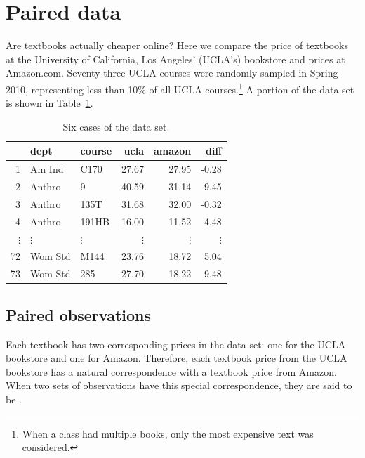 


\textC{\newpage}



\section{Paired data}
\label{pairedData}


Are textbooks actually cheaper online? Here we compare the price of textbooks at the University of California, Los Angeles' (UCLA's) bookstore and prices at Amazon.com. Seventy-three UCLA courses were randomly sampled in Spring 2010, representing less than 10\% of all UCLA courses.\footnote{When a class had multiple books, only the most expensive text was considered.} A portion of the data set is shown in Table~\ref{textbooksDF}.

\begin{table}[h]
\centering
\begin{tabular}{rllrrr}
  \hline
 & dept & course & ucla & amazon & diff \\ 
  \hline
1 & Am Ind &  C170 & 27.67 & 27.95 & -0.28 \\ 
  2 & Anthro & 9 & 40.59 & 31.14 & 9.45 \\ 
  3 & Anthro & 135T & 31.68 & 32.00 & -0.32 \\ 
  4 & Anthro & 191HB & 16.00 & 11.52 & 4.48 \\ 
$\vdots$ & $\vdots$ & $\vdots$ & $\vdots$ & $\vdots$ & $\vdots$ \\
  72 & Wom Std & M144 & 23.76 & 18.72 & 5.04 \\ 
  73 & Wom Std & 285 & 27.70 & 18.22 & 9.48 \\ 
   \hline
\end{tabular}
\caption{Six cases of the  data set.}
\label{textbooksDF}
\end{table}

\subsection{Paired observations}

Each textbook has two corresponding prices in the data set: one for the UCLA bookstore and one for Amazon. Therefore, each textbook price from the UCLA bookstore has a natural correspondence with a textbook price from Amazon. When two sets of observations have this special correspondence, they are said to be .

